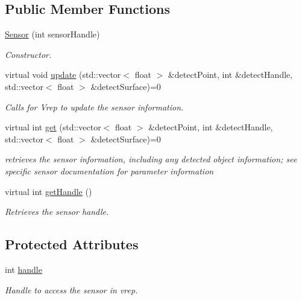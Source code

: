 \subsection*{Public Member Functions}
\begin{DoxyCompactItemize}
\item 
\hyperlink{classSensor_aec15220e0b38da37e43b0525ac689499}{Sensor} (int sensor\+Handle)
\begin{DoxyCompactList}\small\item\em Constructor. \end{DoxyCompactList}\item 
virtual void \hyperlink{classSensor_aae4a856357eba6f54139b5add751d230}{update} (std\+::vector$<$ float $>$ \&detect\+Point, int \&detect\+Handle, std\+::vector$<$ float $>$ \&detect\+Surface)=0
\begin{DoxyCompactList}\small\item\em Calls for Vrep to update the sensor information. \end{DoxyCompactList}\item 
virtual int \hyperlink{classSensor_a997a8679d48c4fa346e6ac43c1e6219a}{get} (std\+::vector$<$ float $>$ \&detect\+Point, int \&detect\+Handle, std\+::vector$<$ float $>$ \&detect\+Surface)=0
\begin{DoxyCompactList}\small\item\em retrieves the sensor information, including any detected object information; see specific sensor documentation for parameter information \end{DoxyCompactList}\item 
virtual int \hyperlink{classSensor_ac647e98897da5ffcc9711ba27ec45abd}{get\+Handle} ()
\begin{DoxyCompactList}\small\item\em Retrieves the sensor handle. \end{DoxyCompactList}\end{DoxyCompactItemize}
\subsection*{Protected Attributes}
\begin{DoxyCompactItemize}
\item 
int \hyperlink{classSensor_ad31f2503e8a1cc7888e5eefbeede8f3b}{handle}
\begin{DoxyCompactList}\small\item\em Handle to access the sensor in vrep. \end{DoxyCompactList}\end{DoxyCompactItemize}


